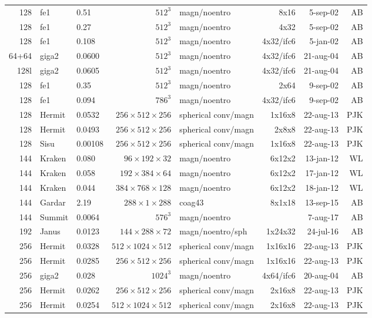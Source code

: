 \documentclass[\mydriver,12pt,twoside,notitlepage,a4paper]{article}
\begin{document}
\begin{center}
\begin{footnotesize}
\begin{longtable}{rllrlrrr}
 128 & fe1   & 0.51 & $512^3$ & magn/noentro & 8x16   &  5-sep-02 & AB \\
 128 & fe1   & 0.27 & $512^3$ & magn/noentro & 4x32   &  5-sep-02 & AB \\
 128 & fe1   & 0.108& $512^3$ & magn/noentro &4x32/ifc6& 5-jan-02 & AB \\
64+64& giga2 & 0.0600&$512^3$ & magn/noentro &4x32/ifc6&21-aug-04 & AB \\
 128l& giga2 & 0.0605&$512^3$ & magn/noentro &4x32/ifc6&21-aug-04 & AB \\
 128 & fe1   & 0.35 & $512^3$ & magn/noentro & 2x64   &  9-sep-02 & AB \\
 128 & fe1   & 0.094& $786^3$ & magn/noentro &4x32/ifc6& 9-sep-02 & AB \\
 128 &Hermit&0.0532&$256{\!\times\!}512{\!\times\!}256$&spherical conv/magn&1x16x8&22-aug-13&PJK\\
 128 &Hermit&0.0493&$256{\!\times\!}512{\!\times\!}256$&spherical conv/magn&2x8x8&22-aug-13&PJK\\
 128 & Sisu  & 0.00108&$256{\!\times\!}512{\!\times\!}256$&spherical conv/magn&1x16x8&22-aug-13&PJK\\
 144 & Kraken& 0.080  &$96{\!\times\!}192{\!\times\!}32$ & magn/noentro & 6x12x2 &13-jan-12 & WL\\
 144 & Kraken& 0.058  &$192{\!\times\!}384{\!\times\!}64$ & magn/noentro & 6x12x2 &17-jan-12 & WL\\
 144 & Kraken& 0.044  &$384{\!\times\!}768{\!\times\!}128$ & magn/noentro & 6x12x2 &18-jan-12 & WL\\
 144 & Gardar& 2.19&  $288{\!\times\!}1{\!\times\!}288$ & coag43&8x1x18 & 13-sep-15& AB \\
 144 &Summit &0.0064& $576^3$ & magn/noentro &        &  7-aug-17 & AB \\
 192 &Janus&0.0123&$144{\!\times\!}288{\!\times\!}72$&magn/noentro/sph&1x24x32& 24-jul-16 & AB \\
 256 &Hermit&0.0328&$512{\!\times\!}1024{\!\times\!}512$&spherical conv/magn&1x16x16&22-aug-13&PJK\\
 256 &Hermit&0.0285&$256{\!\times\!}512{\!\times\!}256$&spherical conv/magn&1x16x16&22-aug-13&PJK\\
 256 & giga2 & 0.028& $1024^3$& magn/noentro &4x64/ifc6&20-aug-04 & AB \\
 256 &Hermit&0.0262&$256{\!\times\!}512{\!\times\!}256$&spherical conv/magn&2x16x8&22-aug-13&PJK\\
 256 &Hermit&0.0254&$512{\!\times\!}1024{\!\times\!}512$&spherical conv/magn&2x16x8&22-aug-13&PJK\\

\end{longtable}
\end{footnotesize}
\end{center}
\end{document}
